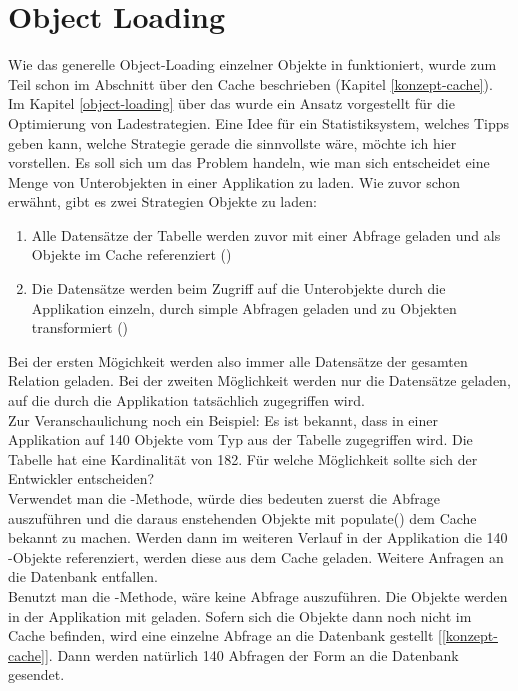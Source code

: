 \section{Object Loading}

Wie das generelle Object-Loading einzelner Objekte in \PSCORM funktioniert, wurde zum Teil schon im Abschnitt über den Cache beschrieben (Kapitel \ref{konzept-cache}). \\
Im Kapitel \ref{object-loading} über das  wurde ein Ansatz vorgestellt für die Optimierung von Ladestrategien. Eine Idee für ein Statistiksystem, welches Tipps geben kann, welche Strategie gerade die sinnvollste wäre, möchte ich hier vorstellen. Es soll sich um das Problem handeln, wie man sich entscheidet eine Menge von Unterobjekten in einer Applikation zu laden. Wie zuvor schon erwähnt, gibt es zwei Strategien Objekte zu laden:
\begin{enumerate}
\item Alle Datensätze der Tabelle werden zuvor mit einer Abfrage geladen und als Objekte im Cache referenziert ()
\item Die Datensätze werden beim Zugriff auf die Unterobjekte durch die Applikation einzeln, durch simple Abfragen geladen und zu Objekten transformiert ()
\end{enumerate}
Bei der ersten Mögichkeit werden also immer alle Datensätze der gesamten Relation geladen. Bei der zweiten Möglichkeit werden nur die Datensätze geladen, auf die durch die Applikation tatsächlich zugegriffen wird. \\
Zur Veranschaulichung noch ein Beispiel: Es ist bekannt, dass in einer Applikation auf 140 Objekte vom Typ  aus der Tabelle  zugegriffen wird. Die Tabelle  hat eine Kardinalität von 182. Für welche Möglichkeit sollte sich der Entwickler entscheiden? \\
Verwendet man die -Methode, würde dies bedeuten zuerst die Abfrage  auszuführen und die daraus enstehenden Objekte mit populate() dem Cache bekannt zu machen. Werden dann im weiteren Verlauf in der Applikation die 140 -Objekte referenziert, werden diese aus dem Cache geladen. Weitere Anfragen an die Datenbank entfallen. \\
Benutzt man die -Methode, wäre keine Abfrage auszuführen. Die Objekte werden in der Applikation mit  geladen. Sofern sich die Objekte dann noch nicht im Cache befinden, wird eine einzelne Abfrage an die Datenbank gestellt [\ref{konzept-cache}]. Dann werden natürlich 140 Abfragen der Form  an die Datenbank gesendet. \\
